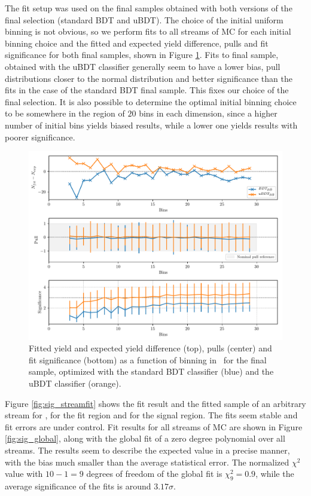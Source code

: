The fit setup was used on the final samples obtained with both versions of the final selection (standard BDT and uBDT). The choice of the initial uniform binning is not obvious, so we perform fits to all streams of MC for each initial binning choice and the fitted and expected yield difference, pulls and fit significance for both final samples, shown in Figure \ref{fig:sig_binning}. Fits to final sample, obtained with the uBDT classifier generally seem to have a lower bias, pull distributions closer to the normal distribution and better significance than the fits in the case of the standard BDT final sample. This fixes our choice of the final selection. It is also possible to determine the optimal initial binning choice to be somewhere in the region of $20$ bins in each dimension, since a higher number of initial bins yields biased results, while a lower one yields results with poorer significance.

\begin{figure}[H]
	\centering
	\captionsetup{width=0.8\linewidth}
	\includegraphics[width=\linewidth]{fig/sig_binning}
	\caption{Fitted yield and expected yield difference (top), pulls (center) and fit significance (bottom) as a function of binning in \vars~for the final sample, optimized with the standard BDT classifier (blue) and the uBDT classifier (orange).}
	\label{fig:sig_binning}
\end{figure}

Figure \ref{fig:sig_streamfit} shows the fit result and the fitted sample of an arbitrary stream for \vars, for the fit region and for the signal region. The fits seem stable and fit errors are under control. Fit results for all streams of MC are shown in Figure \ref{fig:sig_global}, along with the global fit of a zero degree polynomial over all streams. The results seem to describe the expected value in a precise manner, with the bias much smaller than the average statistical error. The normalized $\chi^2$ value with $10-1=9$ degrees of freedom of the global fit is $\chi^2_9 = 0.9$, while the average significance of the fits is around $3.17 \sigma$.

